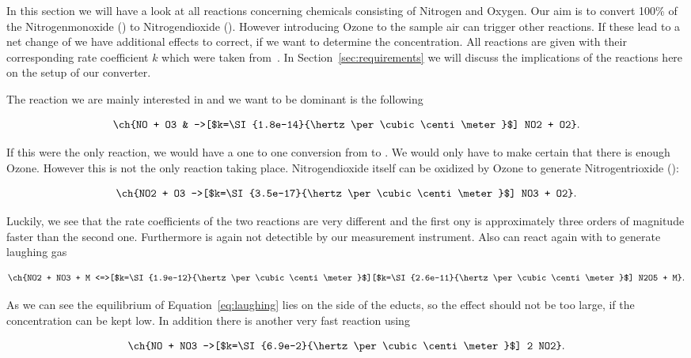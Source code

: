 In this section we will have a look at all reactions concerning
chemicals consisting of Nitrogen and Oxygen. Our aim is to convert
100\% of the Nitrogenmonoxide () to Nitrogendioxide
(). However introducing Ozone to the sample air can trigger
other reactions. If these lead to a net change of  we have
additional effects to correct, if we want to determine the 
concentration. All reactions are given with their corresponding rate
coefficient $k$ which were taken from~\cite{bsc}. In
Section~\ref{sec:requirements} we will discuss the implications of the
reactions here on the setup of our converter.

The reaction we are mainly interested in and we want to be dominant is
the following

\begin{align*}
  \ch{NO + O3 & ->[$k=\SI{1.8e-14}{\hertz\per\cubic\centi\meter}$] NO2 + O2}.
\end{align*}

If this were the only reaction, we would have a one to one conversion
from  to . We would only have to make certain that
there is enough Ozone. However this is not the only reaction taking
place. Nitrogendioxide itself can be oxidized by Ozone to generate
Nitrogentrioxide ():

\begin{align*}
  \ch{NO2 + O3 ->[$k=\SI{3.5e-17}{\hertz\per\cubic\centi\meter}$] NO3 + O2}.
\end{align*}

Luckily, we see that the rate coefficients of the two reactions are
very different and the first ony is approximately three orders of
magnitude faster than the second one. Furthermore  is again
not detectible by our measurement instrument. Also  can react
again with  to generate laughing gas

\begin{align}
  \ch{NO2 + NO3 + M
  <=>[$k=\SI{1.9e-12}{\hertz\per\cubic\centi\meter}$][$k=\SI{2.6e-11}{\hertz\per\cubic\centi\meter}$]
  N2O5 + M}. \label{eq:laughing}
\end{align}

As we can see the equilibrium of Equation~\eqref{eq:laughing} lies on the
side of the educts, so the effect should not be too large, if the
 concentration can be kept low. In addition there is another
very fast reaction using 

\begin{align}
  \ch{NO + NO3 ->[$k=\SI{6.9e-2}{\hertz\per\cubic\centi\meter}$] 2 NO2}.\label{eq:back}
\end{align}

